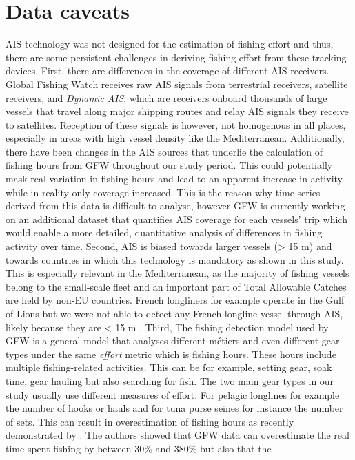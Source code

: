 \section{Data caveats}
AIS technology was not designed for the estimation of fishing effort and thus, there are some
persistent challenges in deriving fishing effort from these tracking devices. First, there are
differences in the coverage of different AIS receivers. Global Fishing Watch receives raw AIS
signals from terrestrial receivers, satellite receivers, and \textit{Dynamic AIS}, which are
receivers onboard thousands of large vessels that travel along major shipping routes and relay AIS
signals they receive to satellites. Reception of these signals is however, not homogenous in all
places, especially in areas with high vessel density like the Mediterranean. Additionally, there
have been changes in the AIS sources that underlie the calculation of fishing hours from GFW
throughout our study period. This could potentially mask real variation in fishing hours and lead
to an apparent increase in activity while in reality only coverage increased. This is the reason
why time series derived from this data is difficult to analyse, however GFW is currently working on
an additional dataset that quantifies AIS coverage for each vessels' trip which would enable a more
detailed, quantitative analysis of differences in fishing activity over time. Second, AIS is biased
towards larger vessels (> 15 m) and towards countries in which this technology is mandatory as
shown in this study. This is especially relevant in the Mediterranean, as the majority of fishing
vessels belong to the small-scale fleet and an important part of Total Allowable Catches are held
by non-EU countries. French longliners for example operate in the Gulf of Lions but we were not
able to detect any French longline vessel through AIS, likely because they are < 15 m
\citep{french_longlines}. Third, The fishing detection model used by GFW is a general model that
analyses different métiers and even different gear types under the same \textit{effort} metric
which is fishing hours. These hours include multiple fishing-related activities. This can be for
example, setting gear, soak time, gear hauling but also searching for fish. The two main gear types
in our study usually use different measures of effort. For pelagic longlines for example the number
of hooks or hauls and for tuna purse seines for instance the number of sets. This can result in
overestimation of fishing hours as recently demonstrated by \cite{bias}. The authors showed that
GFW data can overestimate the real time spent fishing by between 30\% and 380\% but also that the
